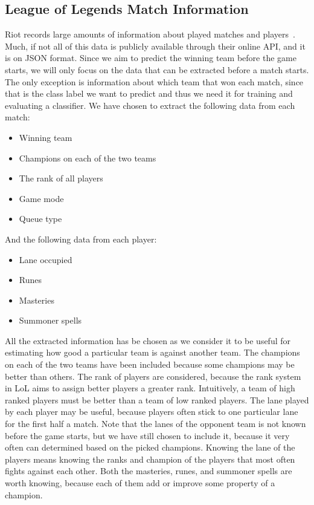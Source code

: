 \subsection{League of Legends Match Information}\label{sec:matchdata}
Riot records large amounts of information about played matches and players~\cite{matchinfo}. Much, if not all of this data is publicly available through their online API, and it is on JSON format. Since we aim to predict the winning team before the game starts, we will only focus on the data that can be extracted before a match starts. The only exception is information about which team that won each match, since that is the class label we want to predict and thus we need it for training and evaluating a classifier.
We have chosen to extract the following data from each match:
\begin{itemize}
\item Winning team
\item Champions on each of the two teams
\item The rank of all players
\item Game mode
\item Queue type
\end{itemize}
And the following data from each player:
\begin{itemize}
\item Lane occupied 
\item Runes 
\item Masteries 
\item Summoner spells 
\end{itemize}
All the extracted information has be chosen as we consider it to be useful for estimating how good a particular team is against another team. 
The champions on each of the two teams have been included because some champions may be better than others.
The rank of players are considered, because the rank system in LoL aims to assign better players a greater rank. Intuitively, a team of high ranked players must be better than a team of low ranked players.
The lane played by each player may be useful, because players often stick to one particular lane for the first half a match.
Note that the lanes of the opponent team is not known before the game starts, but we have still chosen to include it, because it very often can determined based on the picked champions. Knowing the lane of the players means knowing the ranks and champion of the players that most often fights against each other.
Both the masteries, runes, and summoner spells are worth knowing, because each of them add or improve some property of a champion. 
